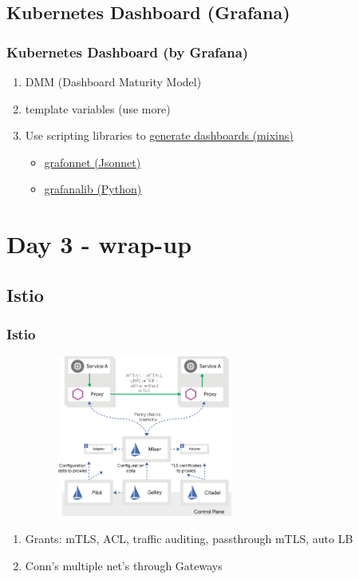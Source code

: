 \documentclass[default]{beamer}
\begin{document}
\subsection{Kubernetes Dashboard (Grafana)}
\begin{frame}
  \frametitle{Kubernetes Dashboard (by Grafana)\footnotemark}
  \begin{enumerate}
    \item DMM (Dashboard Maturity Model)
    \item template variables (use more)
    \item Use scripting libraries to \href{https://www.youtube.com/watch?v=GDdnL5R_l-Y}{generate dashboards (mixins)}
    \begin{itemize}
      \item \href{https://github.com/grafana/grafonnet-lib}{grafonnet (Jsonnet)}
      \item \href{https://github.com/weaveworks/grafanalib}{grafanalib (Python)}
    \end{itemize}
  \end{enumerate}
\end{frame}


\section{Day 3 - wrap-up}


\subsection{Istio}
\begin{frame}
  \frametitle{Istio\footnotemark}
  \begin{figure}
    \includegraphics[width=200pt,height=150pt]{static/istio2.png}
  \end{figure}
  \begin{enumerate}
    \item Grants: mTLS, ACL, traffic auditing, passthrough mTLS, auto LB
    \item Conn's multiple net's through Gateways
  \end{enumerate}
\end{frame}
\end{document}
